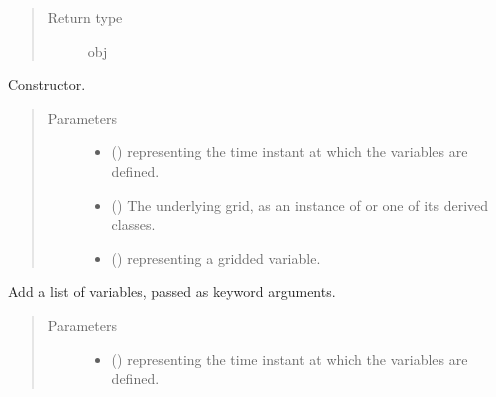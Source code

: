 \documentclass[letterpaper,10pt,english]{sphinxmanual}
\begin{document}
\begin{fulllineitems}
\begin{fulllineitems}
\begin{quote}
\begin{description}
\item[{Return type}] \leavevmode
obj

\end{description}\end{quote}

\end{fulllineitems}


\begin{fulllineitems}
\label{\detokenize{api:tasmania.storages.grid_data.GridData.__init__}}
Constructor.
\begin{quote}\begin{description}
\item[{Parameters}] \leavevmode\begin{itemize}
\item {} 
 () \textendash{}  representing the time instant at which the variables are defined.

\item {} 
 () \textendash{} The underlying grid, as an instance of {\hyperref[\detokenize{api:tasmania.grids.grid_xyz.GridXYZ}]{}} or one of its derived classes.

\item {} 
 () \textendash{}  representing a gridded variable.

\end{itemize}

\end{description}\end{quote}

\end{fulllineitems}


\begin{fulllineitems}
\label{\detokenize{api:tasmania.storages.grid_data.GridData.add_variables}}
Add a list of variables, passed as keyword arguments.
\begin{quote}\begin{description}
\item[{Parameters}] \leavevmode\begin{itemize}
\item {} 
 () \textendash{}  representing the time instant at which the variables are defined.


\end{itemize}
\end{description}
\end{quote}
\end{fulllineitems}
\end{fulllineitems}
\end{document}
